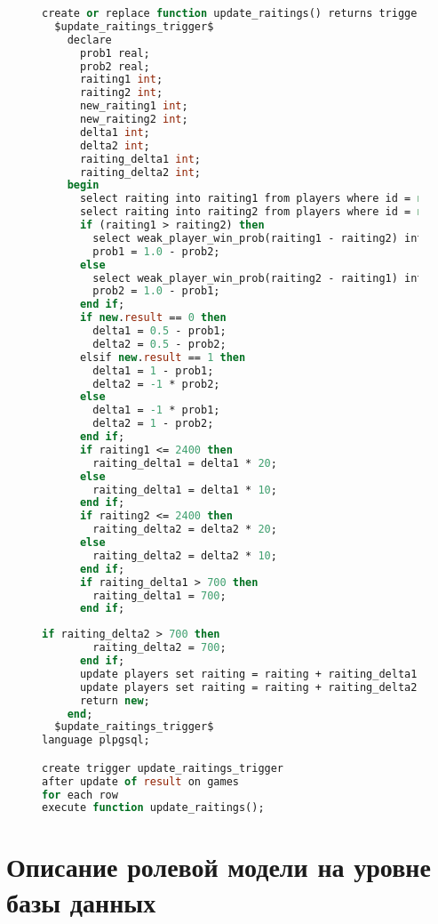 \begin{figure}[H]
	\begin{lstlisting}[label=update_raitings_lst1,caption=Триггер обновления рейтинга игроков (начало),language=Caml]
create or replace function update_raitings() returns trigger as
  $update_raitings_trigger$
    declare
      prob1 real;
      prob2 real;
      raiting1 int;
      raiting2 int;
      new_raiting1 int;
      new_raiting2 int;
      delta1 int;
      delta2 int;
      raiting_delta1 int;
      raiting_delta2 int;
    begin
      select raiting into raiting1 from players where id = new.first_player_id;
      select raiting into raiting2 from players where id = new.second_player_id;
      if (raiting1 > raiting2) then
        select weak_player_win_prob(raiting1 - raiting2) into prob2;
        prob1 = 1.0 - prob2;
      else
        select weak_player_win_prob(raiting2 - raiting1) into prob1;
        prob2 = 1.0 - prob1;
      end if;
      if new.result == 0 then
        delta1 = 0.5 - prob1;
        delta2 = 0.5 - prob2;
      elsif new.result == 1 then
        delta1 = 1 - prob1;
        delta2 = -1 * prob2;
      else
        delta1 = -1 * prob1;
        delta2 = 1 - prob2;
      end if;
      if raiting1 <= 2400 then
        raiting_delta1 = delta1 * 20;
      else
        raiting_delta1 = delta1 * 10;
      end if;
      if raiting2 <= 2400 then
        raiting_delta2 = delta2 * 20;
      else
        raiting_delta2 = delta2 * 10;
      end if;
      if raiting_delta1 > 700 then
        raiting_delta1 = 700;
      end if;
	\end{lstlisting}
\end{figure}
\begin{figure}[H]
	\begin{lstlisting}[label=update_raitings_lst2,caption=Триггер обновления рейтинга игроков (конец),language=Caml]
      if raiting_delta2 > 700 then
        raiting_delta2 = 700;
      end if;
      update players set raiting = raiting + raiting_delta1 where id = new.first_player_id;
      update players set raiting = raiting + raiting_delta2 where id = new.second_player_id;
      return new;
    end;
  $update_raitings_trigger$
language plpgsql;

create trigger update_raitings_trigger
after update of result on games
for each row 
execute function update_raitings();
	\end{lstlisting}
\end{figure}

\section{Описание ролевой модели на уровне базы данных}

